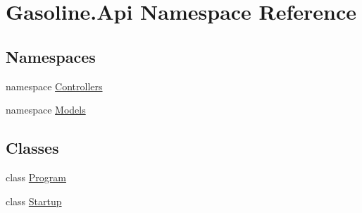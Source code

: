\hypertarget{namespace_gasoline_1_1_api}{}\section{Gasoline.\+Api Namespace Reference}
\label{namespace_gasoline_1_1_api}
\subsection*{Namespaces}
\begin{DoxyCompactItemize}
\item 
namespace \mbox{\hyperlink{namespace_gasoline_1_1_api_1_1_controllers}{Controllers}}
\item 
namespace \mbox{\hyperlink{namespace_gasoline_1_1_api_1_1_models}{Models}}
\end{DoxyCompactItemize}
\subsection*{Classes}
\begin{DoxyCompactItemize}
\item 
class \mbox{\hyperlink{class_gasoline_1_1_api_1_1_program}{Program}}
\item 
class \mbox{\hyperlink{class_gasoline_1_1_api_1_1_startup}{Startup}}
\end{DoxyCompactItemize}
